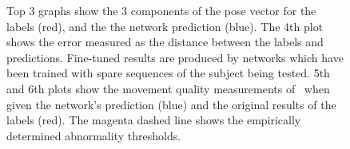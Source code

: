 \documentclass[11pt]{article} %
\begin{document}
\begin{figure}
\ContinuedFloat
\centering
%
\qquad%
%
\caption{Top 3 graphs show the 3 components of the pose vector for the labels (red), and the the network prediction (blue). The 4th plot shows the error measured as the distance between the labels and predictions. Fine-tuned results are produced by networks which have been trained with spare sequences of the subject being tested. 5th and 6th plots show the movement quality measurements of~\cite{Paiement} when given the network's prediction (blue) and the original results of the labels (red). The magenta dashed line shows the empirically determined abnormality thresholds. }
\label{fig:s7-12}
\end{figure}
\end{document}
